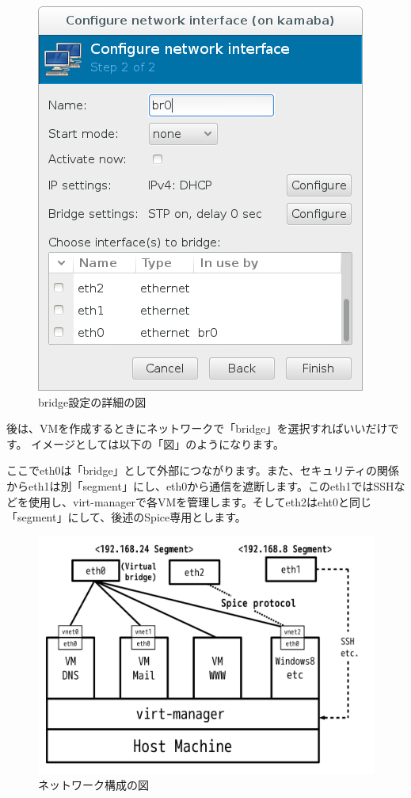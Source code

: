 \documentclass[mingoth,a4paper]{jsarticle}
\begin{document}
\begin{figure}[!b]
\centering
\includegraphics{image201404/bridge2.png}
\caption{bridge設定の詳細の図}
\end{figure}
\clearpage

後は、VMを作成するときにネットワークで「bridge」を選択すればいいだけです。
イメージとしては以下の「図」のようになります。

ここでeth0は「bridge」として外部につながります。また、セキュリティの関係からeth1は別「segment」にし、eth0から通信を遮断します。このeth1ではSSHなどを使用し、virt-managerで各VMを管理します。そしてeth2はeht0と同じ「segment」にして、後述のSpice専用とします。

\begin{figure}[!h]
\centering
\includegraphics[scale=0.3]{image201404/kvmnetwork3.png}
\caption{ネットワーク構成の図}
\end{figure}
\end{document}
